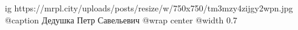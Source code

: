  
 
 
 
 

\ifcmt
  ig https://mrpl.city/uploads/posts/resize/w/750x750/tm3mzy4zijgy2wpn.jpg
	@caption Дедушка Петр Савельевич
  @wrap center
  @width 0.7
\fi
